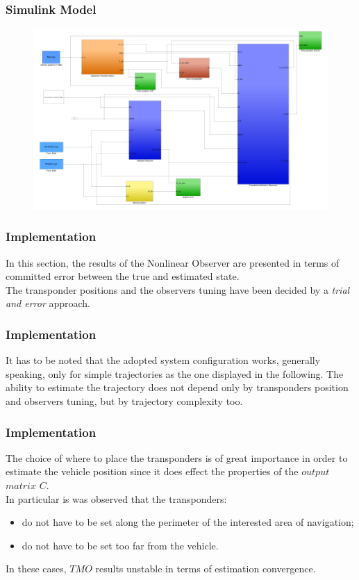 \documentclass{beamer}
\begin{document}
	\begin{frame}
		\frametitle{Simulink Model}
	
		\begin{figure}[H]
			\includegraphics[scale=0.3]{continuous_mod.png}
		\end{figure}
	\end{frame}

    \begin{frame}
        \frametitle{Implementation}
        In this section, the results of the Nonlinear Observer
        are presented in terms of committed error between the
        true and estimated state.\\
		The transponder positions and the observers tuning have been decided by a \textit{trial and error} approach.
    \end{frame}
    
    \begin{frame}
    	\frametitle{Implementation}
    	It has to be noted that the adopted system configuration works, generally speaking, only for simple trajectories as the one displayed in the following. The ability to estimate the trajectory does not depend only by transponders position and observers tuning, but by trajectory complexity too.
    \end{frame}
    
    \begin{frame}
	    \frametitle{Implementation}
	     The choice of where to place the transponders is of great importance in order to estimate the vehicle position since it does effect the properties of the $output$ $matrix$ $C$.\\
	    
	    In particular is was observed that the transponders:
	    \begin{itemize}
	    	\item do not have to be set along the perimeter of the interested area of navigation;
	    	\item do not have to be set too far from the vehicle.	    	
	    \end{itemize}
	        In these cases, $TMO$ results unstable in terms of estimation convergence. 
    \end{frame}
\end{document}
